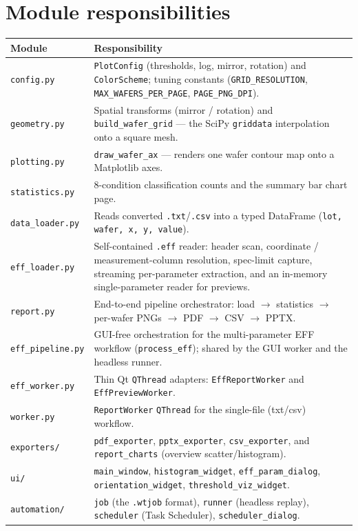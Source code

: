 \documentclass[11pt,a4paper]{report}
\newcommand{\code}[1]{\texttt{#1}}
\begin{document}
\section{Module responsibilities}
\begin{longtable}{@{}p{4.3cm}p{10.2cm}@{}}
\toprule
\textbf{Module} & \textbf{Responsibility}\\
\midrule
\endhead
\code{config.py} & \code{PlotConfig} (thresholds, log, mirror, rotation) and
  \code{ColorScheme}; tuning constants (\code{GRID\_RESOLUTION},
  \code{MAX\_WAFERS\_PER\_PAGE}, \code{PAGE\_PNG\_DPI}).\\
\code{geometry.py} & Spatial transforms (mirror / rotation) and
  \code{build\_wafer\_grid} — the SciPy \code{griddata} interpolation onto a
  square mesh.\\
\code{plotting.py} & \code{draw\_wafer\_ax} — renders one wafer contour map onto a
  Matplotlib axes.\\
\code{statistics.py} & 8-condition classification counts and the summary bar
  chart page.\\
\code{data\_loader.py} & Reads converted \code{.txt}/\code{.csv} into a typed
  DataFrame (\code{lot, wafer, x, y, value}).\\
\code{eff\_loader.py} & Self-contained \code{.eff} reader: header scan, coordinate
  / measurement-column resolution, spec-limit capture, streaming per-parameter
  extraction, and an in-memory single-parameter reader for previews.\\
\code{report.py} & End-to-end pipeline orchestrator: load $\to$ statistics $\to$
  per-wafer PNGs $\to$ PDF $\to$ CSV $\to$ PPTX.\\
\code{eff\_pipeline.py} & GUI-free orchestration for the multi-parameter EFF
  workflow (\code{process\_eff}); shared by the GUI worker and the headless
  runner.\\
\code{eff\_worker.py} & Thin Qt \code{QThread} adapters: \code{EffReportWorker}
  and \code{EffPreviewWorker}.\\
\code{worker.py} & \code{ReportWorker} \code{QThread} for the single-file
  (txt/csv) workflow.\\
\code{exporters/} & \code{pdf\_exporter}, \code{pptx\_exporter},
  \code{csv\_exporter}, and \code{report\_charts} (overview scatter/histogram).\\
\code{ui/} & \code{main\_window}, \code{histogram\_widget},
  \code{eff\_param\_dialog}, \code{orientation\_widget}, \code{threshold\_viz\_widget}.\\
\code{automation/} & \code{job} (the \code{.wtjob} format), \code{runner}
  (headless replay), \code{scheduler} (Task Scheduler), \code{scheduler\_dialog}.\\
\bottomrule
\end{longtable}
\end{document}
